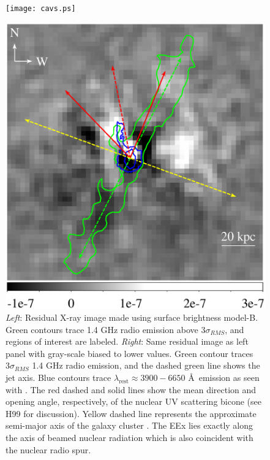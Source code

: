 \begin{figure}
  \begin{center}
    \begin{minipage}{0.495\linewidth}
      \texttt{[image: cavs.ps]}
    \end{minipage}
    \begin{minipage}{0.495\linewidth}
      \includegraphics*[width=\textwidth]{resid_cones.ps}
    \end{minipage}
    \caption{{\it{Left}}: Residual X-ray image made using surface
      brightness model-B. Green contours trace 1.4 GHz radio emission
      above $3\sigma_{RMS}$, and regions of interest are
      labeled. {\it{Right}}: Same residual image as left panel with
      gray-scale biased to lower values. Green contour traces
      $3\sigma_{RMS}$ 1.4 GHz radio emission, and the dashed green
      line shows the jet axis. Blue contours trace
      $\lambda_{\mathrm{rest}} \approx 3900-6650$ \AA\ emission as
      seen with \hst. The red dashed and solid lines show the mean
      direction and opening angle, respectively, of the nuclear UV
      scattering bicone (see H99 for discussion). Yellow dashed line
      represents the approximate semi-major axis of the galaxy cluster
      \citep[see][]{1988ApJ...328..161K}. The EEx lies exactly along
      the axis of beamed nuclear radiation which is also coincident
      with the nuclear radio spur.}
    \label{fig:resid}
  \end{center}
\end{figure}

